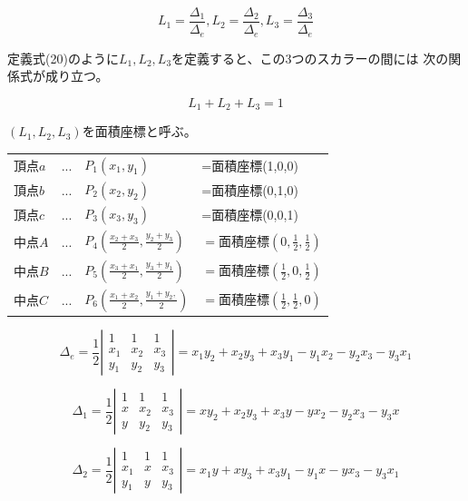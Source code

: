 \documentclass{jarticle}
\begin{document}
\begin{equation}
\displaystyle
L_1 = \frac{\Delta_1}{\Delta_e},
L_2 = \frac{\Delta_2}{\Delta_e},
L_3 = \frac{\Delta_3}{\Delta_e}
\end{equation}


定義式(20)のように$L_1, L_2, L_3$を定義すると、この3つのスカラーの間には
次の関係式が成り立つ。

\begin{equation}
\displaystyle
L_1 + L_2 + L_3 = 1
\end{equation}

$(L_1,L_2,L_3)$を面積座標と呼ぶ。



\begin{center}
\begin{tabular}{llll}
  $頂点a$&...&$P_1(x_1,y_1)$&=面積座標(1,0,0)\\
  $頂点b$&...&$P_2(x_2,y_2)$&=面積座標(0,1,0)\\
  $頂点c$&...&$P_3(x_3,y_3)$&=面積座標(0,0,1)\\
  $中点A$&...&$P_4(\frac{x_2+x_3}{2},\frac{y_2+y_3}{2})$&$=面積座標(0,\frac{1}{2},\frac{1}{2})$\\
  $中点B$&...&$P_5(\frac{x_3+x_1}{2},\frac{y_3+y_1}{2})$&$=面積座標(\frac{1}{2},0,\frac{1}{2})$\\
  $中点C$&...&$P_6(\frac{x_1+x_2}{2},\frac{y_1+y_2,}{2})$&$=面積座標(\frac{1}{2},\frac{1}{2},0)$
\end{tabular}
\end{center}


\begin{equation}
  \Delta_e = \frac{1}{2}\left|\begin{array}{ccc}
  1&1&1\\
  x_1&x_2&x_3\\
  y_1&y_2&y_3
  \end{array}\right|=x_1 y_2 + x_2 y_3 + x_3 y_1- y_1 x_2 - y_2 x_3 - y_3 x_1
\end{equation}


\begin{equation}
  \Delta_1 = \frac{1}{2}\left|\begin{array}{ccc}
  1&1&1\\
  x&x_2&x_3\\
  y&y_2&y_3
  \end{array}\right|=x y_2 + x_2 y_3 + x_3 y- y x_2 - y_2 x_3 - y_3 x
\end{equation}


\begin{equation}
  \Delta_2 = \frac{1}{2}\left|\begin{array}{ccc}
  1&1&1\\
  x_1&x&x_3\\
  y_1&y&y_3
  \end{array}\right|=x_1 y + x y_3 + x_3 y_1- y_1 x - y x_3 - y_3 x_1
\end{equation}
\end{document}
